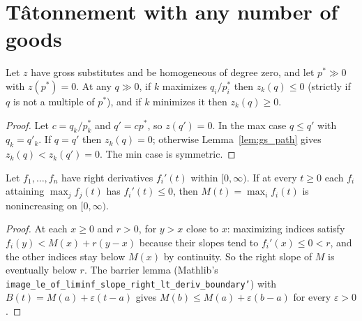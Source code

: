 \section{Tâtonnement with any number of goods}
\label{sec:tatonnement_sup}

\begin{lemma}
\label{lem:gs_extreme_ratio}
\leanok
{}
Let $z$ have gross substitutes and be homogeneous of degree zero, and let $p^* \gg 0$ with $z(p^*) = 0$. At any
$q \gg 0$, if $k$ maximizes $q_i/p^*_i$ then $z_k(q) \le 0$ (strictly if $q$ is not a multiple of $p^*$), and if $k$ minimizes it then $z_k(q) \ge 0$.
\end{lemma}
\begin{proof}
\leanok
Let $c = q_k/p^*_k$ and $q' = c p^*$, so $z(q') = 0$. In the max case $q \le q'$ with $q_k = q'_k$. If $q = q'$ then
$z_k(q) = 0$; otherwise Lemma~\ref{lem:gs_path} gives $z_k(q) < z_k(q') = 0$. The min case is symmetric.
\end{proof}

\begin{lemma}
\label{lem:sup_antitone}
\leanok
Let $f_1, \dots, f_n$ have right derivatives $f_i'(t)$ within $[0,\infty)$. If at every $t \ge 0$ each $f_i$ attaining
$\max_j f_j(t)$ has $f_i'(t) \le 0$, then $M(t) = \max_i f_i(t)$ is nonincreasing on $[0,\infty)$.
\end{lemma}
\begin{proof}
\leanok
At each $x \ge 0$ and $r > 0$, for $y > x$ close to $x$: maximizing indices satisfy $f_i(y) < M(x) + r(y-x)$ because
their slopes tend to $f_i'(x) \le 0 < r$, and the other indices stay below $M(x)$ by continuity. So the right slope of $M$
is eventually below $r$. The barrier lemma (Mathlib's \texttt{image\_le\_of\_liminf\_slope\_right\_lt\_deriv\_boundary'})
with $B(t) = M(a) + \varepsilon(t-a)$ gives $M(b) \le M(a) + \varepsilon(b-a)$ for every $\varepsilon > 0$.
\end{proof}

